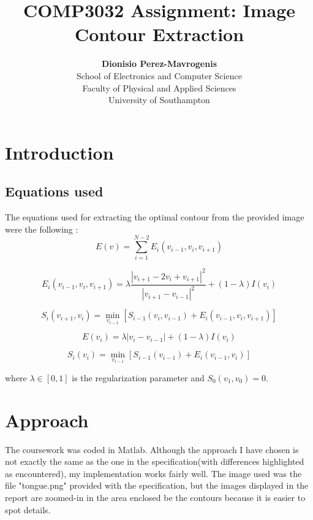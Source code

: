 \documentclass[12pt,onecolumn,a4paper]{report}
\begin{document}
\title{COMP3032 Assignment: Image Contour Extraction}
\author{ \textbf{ Dionisio Perez-Mavrogenis}\\
		School of Electronics and Computer Science \\
		Faculty of Physical and Applied Sciences \\
		University of Southampton}
\maketitle

\tableofcontents
\pagebreak

\section{Introduction}
\subsection{Equations used}

The equations used for extracting the optimal contour from the provided image were the following :
\begin{equation}
E(v) = \sum^{N-2}_{i=1} E_i (v_{i-1},v_i,v_{i+1})
\end{equation}

\begin{equation}
E_i (v_{i-1},v_i,v_{i+1}) = \lambda \frac{|v_{i+1} - 2v_i + v_{i+1}|^2}{|v_{i+1} - v_{i-1}|^2} + (1-\lambda)I(v_i)
\end{equation}

\begin{equation}
S_i(v_{i+1},v_i) = \min_{v_{i-1}}[S_{i-1}(v_i,v_{i-1}) + E_i (v_{i-1},v_i,v_{i+1})]
\end{equation}

\begin{equation}
E(v_i) = \lambda |v_i - v_{i-1}| + (1-\lambda)I(v_i)
\end{equation}

\begin{equation}
S_i(v_i) = \min_{v_{i-1}}[S_{i-1}(v_{i-1})+E_i(v_{i-1},v_i)]
\end{equation}

where $\lambda \in [0,1]$ is the regularization parameter and $S_0(v_1,v_0) = 0$.
\section{Approach}
The coursework was coded in Matlab. Although the approach I have chosen is not exactly the same as the one in the specification(with differences highlighted as encountered), my implementation works fairly well.
The image used was the file "tongue.png" provided with the specification, but the images displayed in the report are zoomed-in in the area enclosed be the contours because it is easier to spot details.
\end{document}
